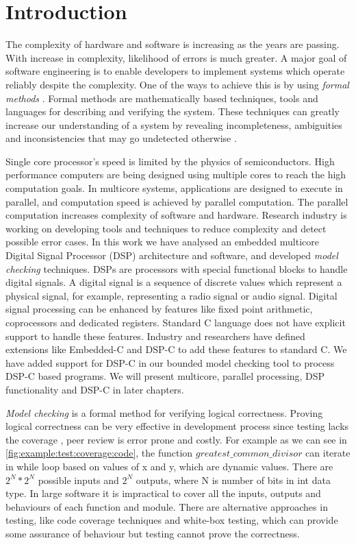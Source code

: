 
\chapter{Introduction}

The complexity of hardware and software is increasing as the years are passing. With increase in complexity, likelihood of errors is much greater. A major goal of software engineering is to enable developers to implement systems which operate reliably despite the complexity. One of the ways to achieve this is by using \emph{formal methods} \cite{clarke1996formal}. Formal methods are mathematically based techniques, tools and languages for describing and verifying the system. These techniques can greatly increase our understanding of a system by revealing incompleteness, ambiguities and inconsistencies that may go undetected otherwise \cite{hall1990seven}.

Single core processor's speed is limited by the physics of semiconductors. High performance computers are being designed using multiple cores to reach the high computation goals. In multicore systems, applications are designed to execute in parallel, and computation speed is achieved by parallel computation. The parallel computation increases complexity of software and hardware. Research industry is working on developing tools and techniques to reduce complexity and detect possible error cases. In this work we have analysed an embedded multicore Digital Signal Processor (DSP) architecture and software, and developed \emph{model checking} techniques. DSPs are processors with special functional blocks to handle digital signals. A digital signal is a sequence of discrete values which represent a physical signal, for example, representing a radio signal or audio signal. Digital signal processing can be enhanced by features like fixed point arithmetic, coprocessors and dedicated registers. Standard C language does not have explicit support to handle these features. Industry and researchers have defined extensions like Embedded-C and DSP-C to add these features to standard C. We have added support for DSP-C in our bounded model checking tool to process DSP-C based programs. We will present multicore, parallel processing, DSP functionality and DSP-C in later chapters.

\emph{Model checking} is a formal method for verifying logical correctness. Proving logical correctness can be very effective in development process since testing lacks the coverage \cite{zhu1997software}, peer review is error prone and costly. For example as we can see in \autoref{fig:example:test:coverage:code}, the function $greatest\_common\_divisor$ can iterate in while loop based on values of x and y, which are dynamic values. There are $2^N * 2^N$ possible inputs and $2^N$ outputs, where N is number of bits in int data type. In large software it is impractical to cover all the inputs, outputs and behaviours of each function and module. There are alternative approaches in testing, like code coverage techniques and white-box testing, which can provide some assurance of behaviour but testing cannot prove the correctness.


